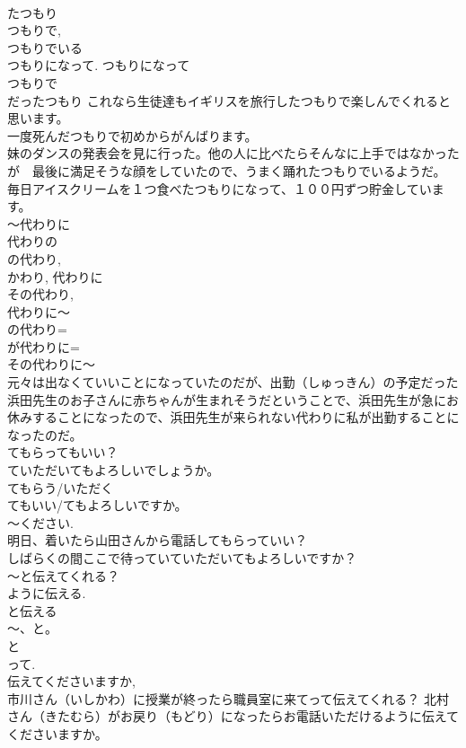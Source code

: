 \documentclass[8pt]{extreport}
\begin{document}
\begin{CJK}{UTF8}{min}
\\	たつもり 
\\	つもりで, 
\\	つもりでいる 
\\	つもりになって. つもりになって 
\\	つもりで 
\\	だったつもり これなら生徒達もイギリスを旅行したつもりで楽しんでくれると思います。 
\\	一度死んだつもりで初めからがんばります。 
\\	妹のダンスの発表会を見に行った。他の人に比べたらそんなに上手ではなかったが　最後に満足そうな顔をしていたので、うまく踊れたつもりでいるようだ。 
\\	毎日アイスクリームを１つ食べたつもりになって、１００円ずつ貯金しています。 
\\	～代わりに	
\\	代わりの
\\	の代わり, 
\\	かわり, 代わりに
\\	その代わり, 
\\	代わりに～ 
\\	の代わり= 
\\	が代わりに= 
\\	その代わりに～ 
\\	元々は出なくていいことになっていたのだが、出勤（しゅっきん）の予定だった浜田先生のお子さんに赤ちゃんが生まれそうだということで、浜田先生が急にお休みすることになったので、浜田先生が来られない代わりに私が出勤することになったのだ。
\\	てもらってもいい？	
\\	ていただいてもよろしいでしょうか。 
\\	てもらう/いただく 
\\	てもいい/てもよろしいですか。 
\\	～ください. 
\\	明日、着いたら山田さんから電話してもらっていい？ 
\\	しばらくの間ここで待っていていただいてもよろしいですか？ 
\\	～と伝えてくれる？	
\\	ように伝える. 
\\	と伝える 
\\	～、と。 
\\	と 
\\	って. 
\\	伝えてくださいますか, 
\\	市川さん（いしかわ）に授業が終ったら職員室に来てって伝えてくれる？ 北村さん（きたむら）がお戻り（もどり）になったらお電話いただけるように伝えてくださいますか。 

\end{CJK}
\end{document}

